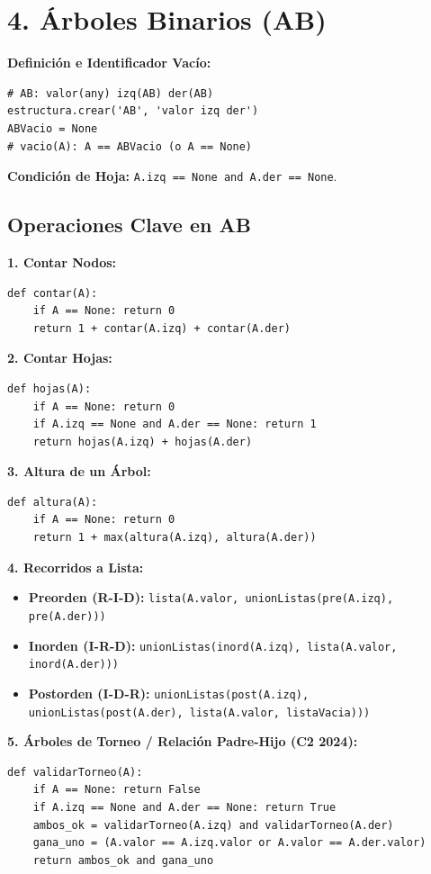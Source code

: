 \documentclass[8pt,twocolumn]{extarticle}
\begin{document}
\section{4. Árboles Binarios (AB)}
\textbf{Definición e Identificador Vacío:}
\begin{verbatim}
# AB: valor(any) izq(AB) der(AB)
estructura.crear('AB', 'valor izq der')
ABVacio = None
# vacio(A): A == ABVacio (o A == None)
\end{verbatim}
\textbf{Condición de Hoja:} \texttt{A.izq == None and A.der == None}.

\subsection{Operaciones Clave en AB}
\textbf{1. Contar Nodos:}
\begin{verbatim}
def contar(A):
    if A == None: return 0
    return 1 + contar(A.izq) + contar(A.der)
\end{verbatim}
\textbf{2. Contar Hojas:}
\begin{verbatim}
def hojas(A):
    if A == None: return 0
    if A.izq == None and A.der == None: return 1
    return hojas(A.izq) + hojas(A.der)
\end{verbatim}
\textbf{3. Altura de un Árbol:}
\begin{verbatim}
def altura(A):
    if A == None: return 0
    return 1 + max(altura(A.izq), altura(A.der))
\end{verbatim}
\textbf{4. Recorridos a Lista:}
\begin{itemize}
    \item \textbf{Preorden (R-I-D):} \texttt{lista(A.valor, unionListas(pre(A.izq), pre(A.der)))}
    \item \textbf{Inorden (I-R-D):} \texttt{unionListas(inord(A.izq), lista(A.valor, inord(A.der)))}
    \item \textbf{Postorden (I-D-R):} \texttt{unionListas(post(A.izq), unionListas(post(A.der), lista(A.valor, listaVacia)))}
\end{itemize}
\textbf{5. Árboles de Torneo / Relación Padre-Hijo (C2 2024):}
\begin{verbatim}
def validarTorneo(A):
    if A == None: return False
    if A.izq == None and A.der == None: return True
    ambos_ok = validarTorneo(A.izq) and validarTorneo(A.der)
    gana_uno = (A.valor == A.izq.valor or A.valor == A.der.valor)
    return ambos_ok and gana_uno
\end{verbatim}
\end{document}
